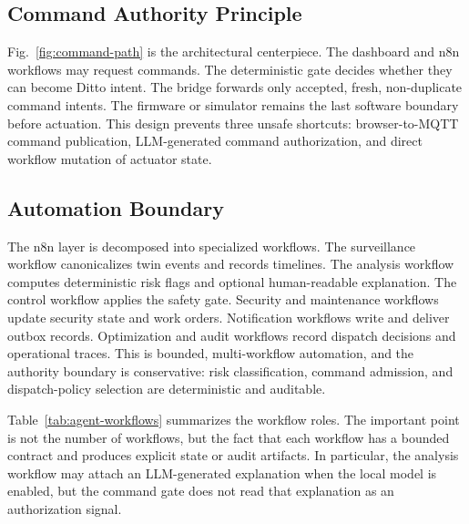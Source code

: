 \documentclass[journal]{IEEEtran}
\begin{document}
\subsection{Command Authority Principle}

Fig.~\ref{fig:command-path} is the architectural centerpiece. The dashboard and n8n workflows may request commands. The deterministic gate decides whether they can become Ditto intent. The bridge forwards only accepted, fresh, non-duplicate command intents. The firmware or simulator remains the last software boundary before actuation. This design prevents three unsafe shortcuts: browser-to-MQTT command publication, LLM-generated command authorization, and direct workflow mutation of actuator state.

\subsection{Automation Boundary}

The n8n layer is decomposed into specialized workflows. The surveillance workflow canonicalizes twin events and records timelines. The analysis workflow computes deterministic risk flags and optional human-readable explanation. The control workflow applies the safety gate. Security and maintenance workflows update security state and work orders. Notification workflows write and deliver outbox records. Optimization and audit workflows record dispatch decisions and operational traces. This is bounded, multi-workflow automation, and the authority boundary is conservative: risk classification, command admission, and dispatch-policy selection are deterministic and auditable.

Table~\ref{tab:agent-workflows} summarizes the workflow roles. The important point is not the number of workflows, but the fact that each workflow has a bounded contract and produces explicit state or audit artifacts. In particular, the analysis workflow may attach an LLM-generated explanation when the local model is enabled, but the command gate does not read that explanation as an authorization signal.
\end{document}
